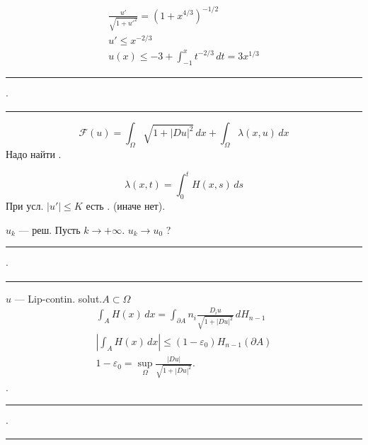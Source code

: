 \begin{gather*}
\frac{u'}{\sqrt{1+u'^2}}=(1+x^{4/3})^{-1/2}\\
u'\le x^{-2/3}\\
u(x)\le -3+\int_{-1}^{x}t^{-2/3}\,dt=3x^{1/3}
\end{gather*}
\hfill\rule{1.4cm}{.35pt}\enspace\(\cdot\)\enspace\rule{1.4cm}{.35pt}\par
\[
\mathcal F(u)=\int_\Omega\sqrt{1+|Du|^2}\,dx+\int_\Omega\lambda(x,u)\,dx
\]
\hfill Надо найти .\par
\[
\lambda(x,t)=\int_0^t H(x,s)\,ds
\]
При усл. \(|u'|\le K\) есть . (иначе нет).

\(u_k\) — реш. Пусть \(k\to+\infty\). \qquad \(u_k\to u_0\) ?
\hfill\rule{1.4cm}{.35pt}\enspace\(\cdot\)\enspace\rule{1.4cm}{.35pt}\par
\(u\) — Lip-contin. solut.\qquad \(A\subset\Omega\)
\begin{gather*}
\int_A H(x)\,dx=\int_{\partial A} n_i\frac{D_i u}{\sqrt{1+|Du|^2}}\,dH_{n-1}\\
\left|\int_A H(x)\,dx\right|\le(1-\varepsilon_0)H_{n-1}(\partial A)\\
\boxed{1-\varepsilon_0=\sup_{\Omega}\frac{|Du|}{\sqrt{1+|Du|^2}}.}
\end{gather*}
.
\hfill\rule{1.4cm}{.35pt}\enspace\(\cdot\)\enspace\rule{1.4cm}{.35pt}\par


